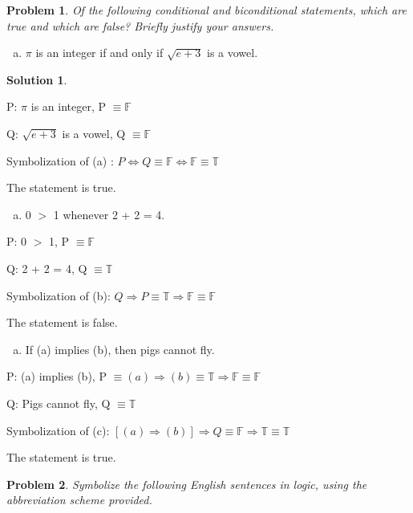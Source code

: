 \documentclass{article}
\newtheorem{problem}{Problem}
\theoremstyle{definition}
\newtheorem*{solution}{Solution}
\begin{document}
\begin{problem}
Of the following conditional and biconditional statements, which are true and which are false?
Briefly justify your answers.
\end{problem}

\begin{enumerate}[(a)]
\item $\pi$ is an integer if and only if $\sqrt{e + 3}$ is a vowel.
\end{enumerate}

\begin{solution}
\end{solution}

P: $\pi$ is an integer,  P \(\equiv \mathds{F}\) \par
Q: $\sqrt{e + 3}$ is a vowel, Q \(\equiv \mathds{F}\)

Symbolization of (a) : \(P \Leftrightarrow Q \equiv \mathds{F} \Leftrightarrow \mathds{F} \equiv \mathds{T} \) \par
The statement is true.

\begin{enumerate}[(b)]
\item 0 $>$ 1 whenever 2 + 2 = 4.
\end{enumerate}

P: 0 $>$ 1,  P \(\equiv \mathds{F}\) \par
Q: 2 + 2 = 4, Q \(\equiv \mathds{T}\)

Symbolization of (b): \(Q \Rightarrow P \equiv \mathds{T} \Rightarrow \mathds{F} \equiv \mathds{F} \) \par
The statement is false.

\begin{enumerate}[(c)]
\item If (a) implies (b), then pigs cannot fly.
\end{enumerate}

P: (a) implies (b),  P \(\equiv (a) \Rightarrow (b) \equiv  \mathds{T} \Rightarrow \mathds{F} \equiv  \mathds{F} \) \par
Q: Pigs cannot fly, Q \(\equiv \mathds{T}\)

Symbolization of (c): \([(a) \Rightarrow (b)] \Rightarrow Q \equiv \mathds{F} \Rightarrow \mathds{T} \equiv \mathds{T} \) \par
The statement is true.

\begin{problem}
Symbolize the following English sentences in logic, using the abbreviation scheme provided.
\end{problem}
\end{document}

